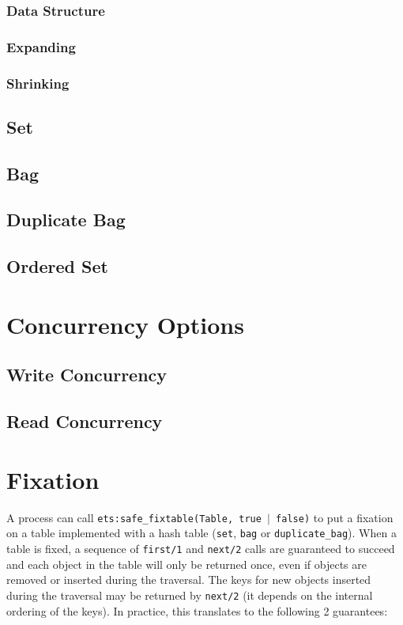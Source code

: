 \documentclass[aps,pre,preprint,nofootinbib]{revtex4}
\begin{document}
\subsubsection{Data Structure}



\subsubsection{Expanding}
\subsubsection{Shrinking}

\subsection{Set}     %
\subsection{Bag}
\subsection{Duplicate Bag}
\subsection{Ordered Set}


\section{Concurrency Options} \label{sec:concurrency_options}

\subsection{Write Concurrency}

\subsection{Read Concurrency}

\section{Fixation}

A process can call \texttt{ets:safe\_fixtable(Table, true $|$ false)} to put a fixation on a table implemented with a hash table (\verb|set|, \verb|bag| or \verb|duplicate_bag|).
When a table is fixed, a sequence of \verb|first/1| and \verb|next/2| calls are guaranteed to succeed and each object in the table will only be returned once, even if objects are removed or inserted during the traversal.
The keys for new objects inserted during the traversal may be returned by \verb|next/2| (it depends on the internal ordering of the keys).
In practice, this translates to the following 2 guarantees:
\end{document}
